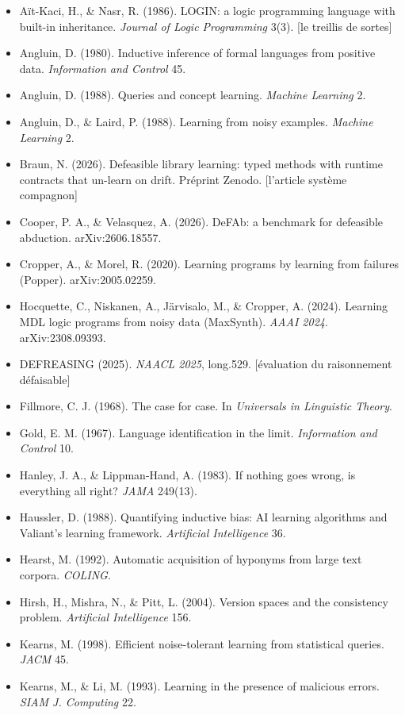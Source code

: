 \documentclass[11pt]{article}
\begin{document}
\begin{itemize}
\item Aït-Kaci, H., \& Nasr, R. (1986). LOGIN: a logic programming language with built-in inheritance. \emph{Journal of Logic Programming} 3(3). [le treillis de sortes]
\item Angluin, D. (1980). Inductive inference of formal languages from positive data. \emph{Information and Control} 45.
\item Angluin, D. (1988). Queries and concept learning. \emph{Machine Learning} 2.
\item Angluin, D., \& Laird, P. (1988). Learning from noisy examples. \emph{Machine Learning} 2.
\item Braun, N. (2026). Defeasible library learning: typed methods with runtime contracts that un-learn on drift. Préprint Zenodo. [l'article système compagnon]
\item Cooper, P. A., \& Velasquez, A. (2026). DeFAb: a benchmark for defeasible abduction. arXiv:2606.18557.
\item Cropper, A., \& Morel, R. (2020). Learning programs by learning from failures (Popper). arXiv:2005.02259.
\item Hocquette, C., Niskanen, A., Järvisalo, M., \& Cropper, A. (2024). Learning MDL logic programs from noisy data (MaxSynth). \emph{AAAI 2024}. arXiv:2308.09393.
\item DEFREASING (2025). \emph{NAACL 2025}, long.529. [évaluation du raisonnement défaisable]
\item Fillmore, C. J. (1968). The case for case. In \emph{Universals in Linguistic Theory}.
\item Gold, E. M. (1967). Language identification in the limit. \emph{Information and Control} 10.
\item Hanley, J. A., \& Lippman-Hand, A. (1983). If nothing goes wrong, is everything all right? \emph{JAMA} 249(13).
\item Haussler, D. (1988). Quantifying inductive bias: AI learning algorithms and Valiant's learning framework. \emph{Artificial Intelligence} 36.
\item Hearst, M. (1992). Automatic acquisition of hyponyms from large text corpora. \emph{COLING}.
\item Hirsh, H., Mishra, N., \& Pitt, L. (2004). Version spaces and the consistency problem. \emph{Artificial Intelligence} 156.
\item Kearns, M. (1998). Efficient noise-tolerant learning from statistical queries. \emph{JACM} 45.
\item Kearns, M., \& Li, M. (1993). Learning in the presence of malicious errors. \emph{SIAM J. Computing} 22.

\end{itemize}
\end{document}
